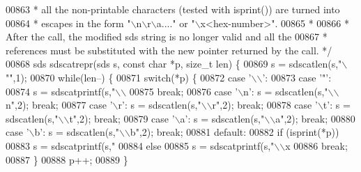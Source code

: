 \begin{DoxyCode}
{{{{{{{{{{{{{00863 \textcolor{comment}{ * all the non-printable characters (tested with isprint()) are turned into}
00864 \textcolor{comment}{ * escapes in the form "\(\backslash\)n\(\backslash\)r\(\backslash\)a...." or "\(\backslash\)x<hex-number>".}
00865 \textcolor{comment}{ *}
00866 \textcolor{comment}{ * After the call, the modified sds string is no longer valid and all the}
00867 \textcolor{comment}{ * references must be substituted with the new pointer returned by the call. */}
00868 sds sdscatrepr(sds s, \textcolor{keyword}{const} \textcolor{keywordtype}{char} *p, size\_t len) \{
00869     s = sdscatlen(s,\textcolor{stringliteral}{"\(\backslash\)""},1);
00870     \textcolor{keywordflow}{while}(len--) \{
00871         \textcolor{keywordflow}{switch}(*p) \{
00872         \textcolor{keywordflow}{case} \textcolor{stringliteral}{'\(\backslash\)\(\backslash\)'}:
00873         \textcolor{keywordflow}{case} \textcolor{stringliteral}{'"'}:
00874             s = sdscatprintf(s,\textcolor{stringliteral}{"\(\backslash\)\(\backslash\)%
00875             \textcolor{keywordflow}{break};
00876         \textcolor{keywordflow}{case} \textcolor{stringliteral}{'\(\backslash\)n'}: s = sdscatlen(s,\textcolor{stringliteral}{"\(\backslash\)\(\backslash\)n"},2); \textcolor{keywordflow}{break};
00877         \textcolor{keywordflow}{case} \textcolor{stringliteral}{'\(\backslash\)r'}: s = sdscatlen(s,\textcolor{stringliteral}{"\(\backslash\)\(\backslash\)r"},2); \textcolor{keywordflow}{break};
00878         \textcolor{keywordflow}{case} \textcolor{stringliteral}{'\(\backslash\)t'}: s = sdscatlen(s,\textcolor{stringliteral}{"\(\backslash\)\(\backslash\)t"},2); \textcolor{keywordflow}{break};
00879         \textcolor{keywordflow}{case} \textcolor{stringliteral}{'\(\backslash\)a'}: s = sdscatlen(s,\textcolor{stringliteral}{"\(\backslash\)\(\backslash\)a"},2); \textcolor{keywordflow}{break};
00880         \textcolor{keywordflow}{case} \textcolor{stringliteral}{'\(\backslash\)b'}: s = sdscatlen(s,\textcolor{stringliteral}{"\(\backslash\)\(\backslash\)b"},2); \textcolor{keywordflow}{break};
00881         \textcolor{keywordflow}{default}:
00882             \textcolor{keywordflow}{if} (isprint(*p))
00883                 s = sdscatprintf(s,\textcolor{stringliteral}{"%
00884             \textcolor{keywordflow}{else}
00885                 s = sdscatprintf(s,\textcolor{stringliteral}{"\(\backslash\)\(\backslash\)x%
00886             \textcolor{keywordflow}{break};
00887         \}
00888         p++;
00889     \}
}}}}}}}}}}}}}}}}
\end{DoxyCode}
